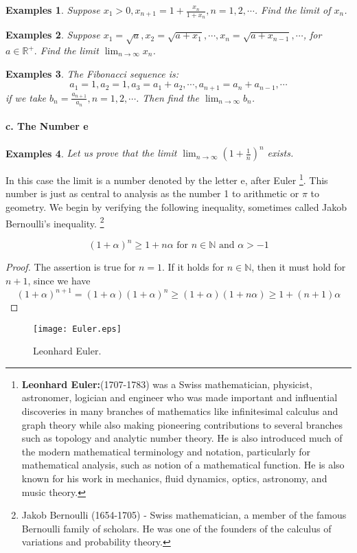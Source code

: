 \documentclass[a4paper,12pt]{article} %
\newtheorem{example}{Examples}
\begin{document}
\begin{example}
    \emph{Suppose} $x_1 > 0, x_{n+1} = 1+\frac{x_n}{1+x_n}, n = 1,2,\cdots$.
    \emph{Find the limit of} $x_n$.
\end{example}

\begin{example}
    \emph{Suppose} $x_1 = \sqrt{a}, x_2 = \sqrt{a+x_1}, \cdots, x_n = \sqrt{a + x_{n-1}}, \cdots$, 
    for $a \in \mathbb{R}^+.$
    \emph{Find the limit} $\lim_{n \to \infty} x_n$.
\end{example}

\begin{example}
    \emph{The Fibonacci sequence is: }
    \[
        a_1 = 1, a_2 = 1, a_3 = a_1 + a_2, \cdots, a_{n+1} = a_n + a_{n-1}, \cdots
        \]
    \emph{if we take }
    $\displaystyle b_n = \frac{a_{n+1}}{a_n}, n = 1,2,\cdots$.
    \emph{Then find the} $\displaystyle \lim_{n \to \infty} b_n$.
\end{example}

\paragraph{{\rm \textbf{c. The Number e }}}
\begin{example}
    Let us prove that the limit $\displaystyle \lim_{n \to \infty}\left(1+\frac{1}{n}\right)^n $ exists.
\end{example}
In this case the limit is a number denoted by the letter e, after Euler
\footnote{\textbf{Leonhard Euler:}(1707-1783) was a Swiss mathematician, 
physicist, astronomer, logician and engineer who was made important and 
influential discoveries in many branches of mathematics like infinitesimal 
calculus and graph theory while also making pioneering contributions to 
several branches such as topology and analytic number theory. He is also
introduced much of the modern mathematical terminology and notation, particularly 
for mathematical analysis, such as notion of a mathematical function. He is also 
known for his work in mechanics, fluid dynamics, optics, astronomy, and music theory.}.
This number is just as central to analysis as the number 1 to arithmetic 
or $\pi$ to geometry. We begin by verifying the following inequality, 
sometimes called Jakob Bernoulli's inequality. \footnote{Jakob Bernoulli 
(1654-1705) - Swiss mathematician, a member of the famous Bernoulli 
family of scholars. He was one of the founders of the calculus of 
variations and probability theory.}

\[(1+\alpha)^n \ge 1 + n\alpha \text{ for } n \in \mathbb{N} \text{ and } \alpha > -1 \]
\begin{proof}
    The assertion is true for $n=1$. If it holds for $n \in \mathbb{N}$,
    then it must hold for $n+1$, since we have 
    \[(1+\alpha)^{n+1}=(1+\alpha)(1+\alpha)^n\ge(1+\alpha)(1+n\alpha)\ge1+(n+1)\alpha\]
\end{proof}
\graphicspath{{../Figs/}}
\begin{figure}[htbp]
    \centering
    \texttt{[image: Euler.eps]}
    \caption{Leonhard Euler.}
    \label{fig:fig1}
\end{figure}
\end{document}
